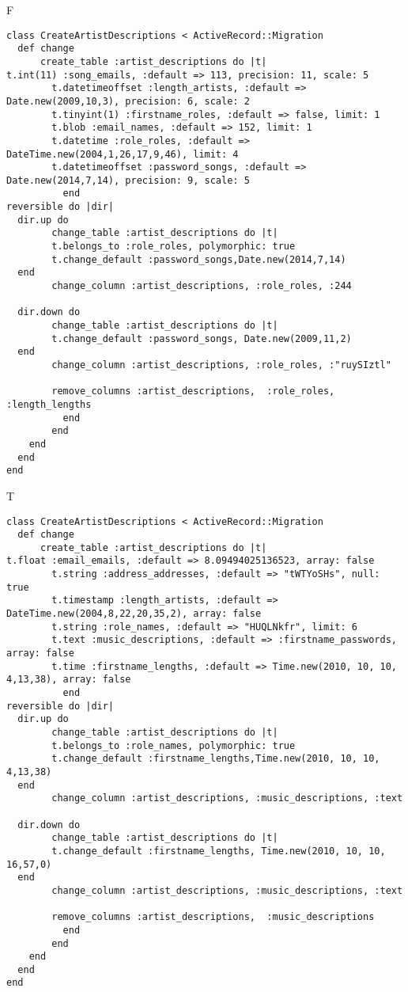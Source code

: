 F
\begin{verbatim}
class CreateArtistDescriptions < ActiveRecord::Migration
  def change
	  create_table :artist_descriptions do |t|
t.int(11) :song_emails, :default => 113, precision: 11, scale: 5
		t.datetimeoffset :length_artists, :default => Date.new(2009,10,3), precision: 6, scale: 2
		t.tinyint(1) :firstname_roles, :default => false, limit: 1
		t.blob :email_names, :default => 152, limit: 1
		t.datetime :role_roles, :default => DateTime.new(2004,1,26,17,9,46), limit: 4
		t.datetimeoffset :password_songs, :default => Date.new(2014,7,14), precision: 9, scale: 5
		  end
reversible do |dir|
  dir.up do
		change_table :artist_descriptions do |t|
		t.belongs_to :role_roles, polymorphic: true
 		t.change_default :password_songs,Date.new(2014,7,14)
  end
 		change_column :artist_descriptions, :role_roles, :244
   
  dir.down do
		change_table :artist_descriptions do |t|
		t.change_default :password_songs, Date.new(2009,11,2)
  end
 		change_column :artist_descriptions, :role_roles, :"ruySIztl"
   
		remove_columns :artist_descriptions,  :role_roles, :length_lengths 
	      end
	    end
    end 
  end
end

\end{verbatim}

T
\begin{verbatim}
class CreateArtistDescriptions < ActiveRecord::Migration
  def change
	  create_table :artist_descriptions do |t|
t.float :email_emails, :default => 8.09494025136523, array: false
		t.string :address_addresses, :default => "tWTYoSHs", null: true
		t.timestamp :length_artists, :default => DateTime.new(2004,8,22,20,35,2), array: false
		t.string :role_names, :default => "HUQLNkfr", limit: 6
		t.text :music_descriptions, :default => :firstname_passwords, array: false
		t.time :firstname_lengths, :default => Time.new(2010, 10, 10, 4,13,38), array: false
		  end
reversible do |dir|
  dir.up do
		change_table :artist_descriptions do |t|
		t.belongs_to :role_names, polymorphic: true
 		t.change_default :firstname_lengths,Time.new(2010, 10, 10, 4,13,38)
  end
 		change_column :artist_descriptions, :music_descriptions, :text
   
  dir.down do
		change_table :artist_descriptions do |t|
		t.change_default :firstname_lengths, Time.new(2010, 10, 10, 16,57,0)
  end
 		change_column :artist_descriptions, :music_descriptions, :text
   
		remove_columns :artist_descriptions,  :music_descriptions 
	      end
	    end
    end 
  end
end

\end{verbatim}

